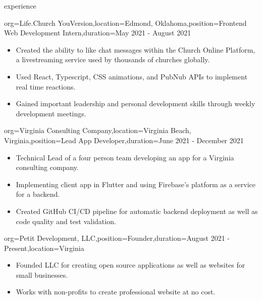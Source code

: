 \documentclass{resume}
\begin{document}
\begin{ResumeSection}{experience}
    \begin{ResumeSubsection}{org={Life.Church YouVersion},location={Edmond, Oklahoma},position={Frontend Web Development Intern},duration={May 2021 - August 2021}}
        \begin{itemize}
            \item {Created the ability to like chat messages within
                    the Church Online Platform, a livestreaming service used by
                thousands of churches globally.}
            \item {Used React, Typescript, CSS animations, and
                PubNub APIs to implement real time reactions.}
            \item Gained important leadership and personal development skills
                through weekly development meetings.
        \end{itemize}
    \end{ResumeSubsection}

    \begin{ResumeSubsection}{org={Virginia Consulting Company},location={Virginia Beach, Virginia},position={Lead App Developer},duration={June 2021 - December 2021}}
        \begin{itemize}
            \item {Technical Lead of a four person team developing an app for a Virginia consulting company.}
            \item {Implementing client app in Flutter and using Firebase's platform as a service for a backend.}
            \item {Created GitHub CI/CD pipeline for automatic backend deployment as well as code quality and test validation.}
        \end{itemize}
    \end{ResumeSubsection}

    \begin{ResumeSubsection}{org={Petit Development, LLC},position={Founder},duration={August 2021 - Present},location={Virginia}}
        \begin{itemize}
            \item Founded LLC for creating open source applications as well as
                websites for small businesses.
            \item Works with non-profits to create professional website at no cost.
        \end{itemize}
    \end{ResumeSubsection}


\end{ResumeSection}
\end{document}
